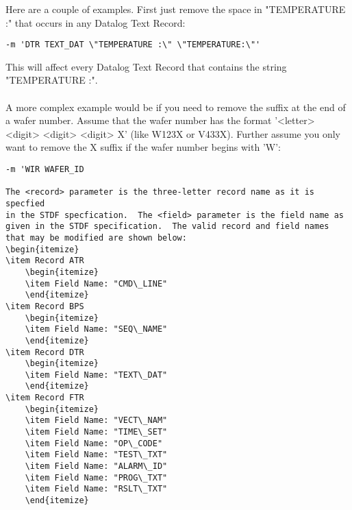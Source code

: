 \documentclass[letterpaper]{article}
\begin{document}
Here are a couple of examples.  First just remove the space in "TEMPERATURE :"
that occurs in any Datalog Text Record:
\begin{verbatim}
-m 'DTR TEXT_DAT \"TEMPERATURE :\" \"TEMPERATURE:\"'
\end{verbatim}
This will affect every Datalog Text Record that contains the string "TEMPERATURE :".\\
\\
A more complex example would be if you need to remove the suffix at the end of
a wafer number.  Assume that the wafer number has the format '<letter> <digit> <digit> <digit> X'
(like W123X or V433X).  Further assume you only want to remove the X suffix if the 
wafer number begins with 'W':
\begin{verbatim}
-m 'WIR WAFER_ID 

The <record> parameter is the three-letter record name as it is specfied
in the STDF specfication.  The <field> parameter is the field name as
given in the STDF specification.  The valid record and field names
that may be modified are shown below:
\begin{itemize}
\item Record ATR
    \begin{itemize}
    \item Field Name: "CMD\_LINE"
    \end{itemize}
\item Record BPS
    \begin{itemize}
    \item Field Name: "SEQ\_NAME"
    \end{itemize}
\item Record DTR
    \begin{itemize}
    \item Field Name: "TEXT\_DAT"
    \end{itemize}
\item Record FTR
    \begin{itemize}
    \item Field Name: "VECT\_NAM"
    \item Field Name: "TIME\_SET"
    \item Field Name: "OP\_CODE"
    \item Field Name: "TEST\_TXT"
    \item Field Name: "ALARM\_ID"
    \item Field Name: "PROG\_TXT"
    \item Field Name: "RSLT\_TXT"
    \end{itemize}

\end{verbatim}
\end{document}
